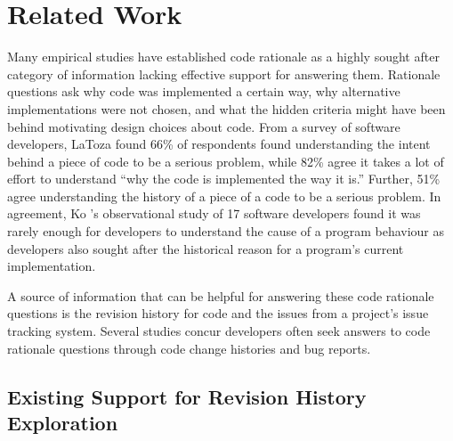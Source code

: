 \chapter{Related Work}
\label{ch:Related-Work}

Many empirical studies have established code rationale as a highly sought after category of information lacking effective support for answering them. \cite{latoza_maintaining_2006, latoza_hard-answer_2010, ko_information_2007}
Rationale questions ask why code was implemented a certain way, why alternative implementations were not chosen, and what the hidden criteria might have been behind motivating design choices about code. \cite{latoza_hard-answer_2010}
From a survey of software developers, LaToza \etal \cite{latoza_maintaining_2006} found 66\% of respondents found understanding the intent behind a piece of code to be a serious problem, 
while 82\% agree it takes a lot of effort to understand ``why the code is implemented the way it is.''
Further, 51\% agree understanding the history of a piece of a code to be a serious problem. \cite{latoza_maintaining_2006}
In agreement, Ko \etal's observational study of 17 software developers found it was rarely enough for developers to understand the cause of a program behaviour as developers also  sought after the historical reason for a program's current implementation. \cite{ko_information_2007}

A source of information that can be helpful for answering these code rationale questions is the revision history for code and the issues from a project's issue tracking system. 
Several studies concur developers often seek answers to code rationale questions through code change histories and bug reports. \cite{ko_information_2007, codoban_software_2015, robillard_turnover-induced_2021}

\section{Existing Support for Revision History Exploration}

